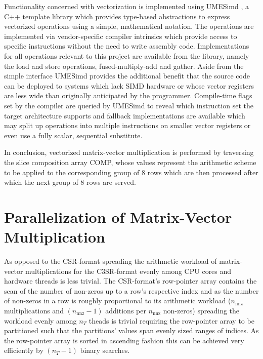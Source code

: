     Functionality concerned with vectorization is implemented using UMESimd \cite{umesimd2017}, a C++ template library
    which provides type-based abstractions to express vectorized operations using a simple, mathematical notation. The
    operations are implemented via vendor-specific compiler intrinsics which provide access to specific instructions
    without the need to write assembly code. Implementations for all operations relevant to this project are available
    from the library, namely the load and store operations, fused-multiply-add and gather. Aside from the simple
    interface UMESimd provides the additional benefit that the source code can be deployed to systems which lack SIMD
    hardware or whose vector registers are less wide than originally anticipated by the programmer. Compile-time flags
    set by the compiler are queried by UMESimd to reveal which instruction set the target architecture supports and
    fallback implementations are available which may split up operations into multiple instructions on smaller vector
    registers or even use a fully scalar, sequential substitute.

    In conclusion, vectorized matrix-vector multiplication is performed by traversing the slice composition array
    COMP, whose values represent the arithmetic scheme to be applied to the corresponding group of $8$ rows which are
    then processed after which the next group of $8$ rows are served.

  \section{Parallelization of Matrix-Vector Multiplication}

    As opposed to the CSR-format spreading the arithmetic workload of matrix-vector multiplications for the C3SR-format
    evenly among CPU cores and hardware threads is less trivial. The CSR-format's row-pointer array contains the scan of
    the number of non-zeros up to a row's respective index and as the number of non-zeros in a row is roughly
    proportional to its arithmetic workload ($n_\text{nnz}$ multiplications and $(n_\text{nnz} - 1)$ additions per
    $n_\text{nnz}$ non-zeros) spreading the workload evenly among $n_T$ theads is trivial requiring the row-pointer
    array to be partitioned such that the partitions' values span evenly sized ranges of indices. As the row-pointer
    array is sorted in ascending fashion this can be achieved very efficiently by $(n_T - 1)$ binary searches.

